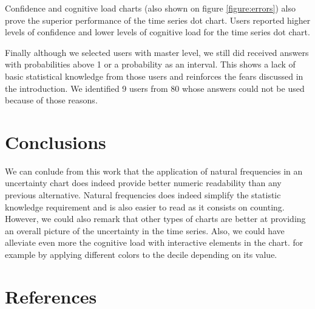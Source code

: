 \documentclass[a4paper,3p,sort&compress]{elsarticle}
\begin{document}
Confidence and cognitive load charts (also shown on figure \ref{figure:errors}) also prove the superior performance 
of the time series dot chart. Users reported higher levels of confidence and 
lower levels of cognitive load for the time series dot chart.


Finally although we selected users with master level, we still did received answers with probabilities 
above 1 or a probability as an interval. This shows a lack of basic statistical knowledge from those 
users and reinforces the fears discussed in the introduction. 
We identified 9 users from 80 whose answers could not be used because of those reasons.

\section{Conclusions}
\label{sec:concl}

We can conlude from this work that the application of natural frequencies in an uncertainty chart does indeed
provide better numeric readability than any previous alternative. Natural frequencies does indeed simplify 
the statistic knowledge requirement and is also easier to read as it consists on counting. However, we could 
also remark that other types of charts are better at providing an overall picture of the uncertainty in the time
series. Also, we could have alleviate even more the cognitive load with interactive elements in the chart. for example
by applying different colors to the decile depending on its value.


\section{References}
\label{sec:ref}



\end{document}
